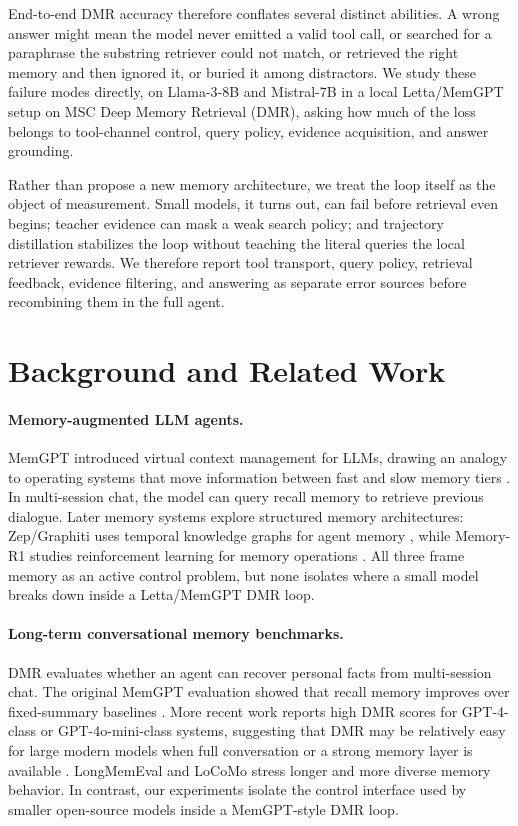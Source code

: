 \documentclass[11pt]{article}
\begin{document}
End-to-end DMR accuracy therefore conflates several distinct abilities. A wrong answer might mean the model never emitted a valid tool call, or searched for a paraphrase the substring retriever could not match, or retrieved the right memory and then ignored it, or buried it among distractors. We study these failure modes directly, on Llama-3-8B and Mistral-7B in a local Letta/MemGPT setup on MSC Deep Memory Retrieval (DMR), asking how much of the loss belongs to tool-channel control, query policy, evidence acquisition, and answer grounding.

Rather than propose a new memory architecture, we treat the loop itself as the object of measurement. Small models, it turns out, can fail before retrieval even begins; teacher evidence can mask a weak search policy; and trajectory distillation stabilizes the loop without teaching the literal queries the local retriever rewards. We therefore report tool transport, query policy, retrieval feedback, evidence filtering, and answering as separate error sources before recombining them in the full agent.

\section{Background and Related Work}

\paragraph{Memory-augmented LLM agents.}
MemGPT introduced virtual context management for LLMs, drawing an analogy to operating systems that move information between fast and slow memory tiers \citep{packer2023memgpt}. In multi-session chat, the model can query recall memory to retrieve previous dialogue. Later memory systems explore structured memory architectures: Zep/Graphiti uses temporal knowledge graphs for agent memory \citep{rasmussen2025zep}, while Memory-R1 studies reinforcement learning for memory operations \citep{yan2025memoryr1}. All three frame memory as an active control problem, but none isolates where a small model breaks down inside a Letta/MemGPT DMR loop.

\paragraph{Long-term conversational memory benchmarks.}
DMR evaluates whether an agent can recover personal facts from multi-session chat. The original MemGPT evaluation showed that recall memory improves over fixed-summary baselines \citep{packer2023memgpt}. More recent work reports high DMR scores for GPT-4-class or GPT-4o-mini-class systems, suggesting that DMR may be relatively easy for large modern models when full conversation or a strong memory layer is available \citep{rasmussen2025zep}. LongMemEval \citep{wu2024longmemeval} and LoCoMo \citep{maharana2024locomo} stress longer and more diverse memory behavior. In contrast, our experiments isolate the control interface used by smaller open-source models inside a MemGPT-style DMR loop.
\end{document}
